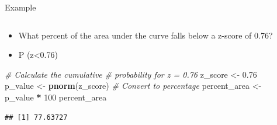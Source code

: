 \documentclass[
  ignorenonframetext,
]{beamer}
\newenvironment{Shaded}{\begin{snugshade}}{\end{snugshade}}
\newcommand{\CommentTok}[1]{\textcolor[rgb]{0.56,0.35,0.01}{\textit{#1}}}
\newcommand{\DecValTok}[1]{\textcolor[rgb]{0.00,0.00,0.81}{#1}}
\newcommand{\FloatTok}[1]{\textcolor[rgb]{0.00,0.00,0.81}{#1}}
\newcommand{\FunctionTok}[1]{\textcolor[rgb]{0.13,0.29,0.53}{\textbf{#1}}}
\newcommand{\NormalTok}[1]{#1}
\newcommand{\OtherTok}[1]{\textcolor[rgb]{0.56,0.35,0.01}{#1}}
\newcommand{\SpecialCharTok}[1]{\textcolor[rgb]{0.81,0.36,0.00}{\textbf{#1}}}
\providecommand{\tightlist}{%
  \setlength{\itemsep}{0pt}\setlength{\parskip}{0pt}}
\begin{document}
\begin{frame}[fragile]{Example}
\label{example-2}
\begin{columns}[T]
\begin{column}{0.5\textwidth}
\vspace{1cm}

\begin{itemize}
\tightlist
\item
  What percent of the area under the curve falls below a z-score of
  0.76?
\end{itemize}

\begin{itemize}
\tightlist
\item
  P (z\textless0.76)
\end{itemize}

\begin{Shaded}
\begin{Highlighting}[]
\CommentTok{\# Calculate the cumulative }
\CommentTok{\# probability for z = 0.76}
\NormalTok{z\_score }\OtherTok{\textless{}{-}} \FloatTok{0.76}
\NormalTok{p\_value }\OtherTok{\textless{}{-}} \FunctionTok{pnorm}\NormalTok{(z\_score)}
\CommentTok{\# Convert to percentage}
\NormalTok{percent\_area }\OtherTok{\textless{}{-}}\NormalTok{ p\_value }\SpecialCharTok{*} \DecValTok{100}
\NormalTok{percent\_area}
\end{Highlighting}
\end{Shaded}

\begin{verbatim}
## [1] 77.63727
\end{verbatim}
\end{column}

\begin{column}{0.5\textwidth}
\vspace{1cm}


\end{column}
\end{columns}
\end{frame}
\end{document}
